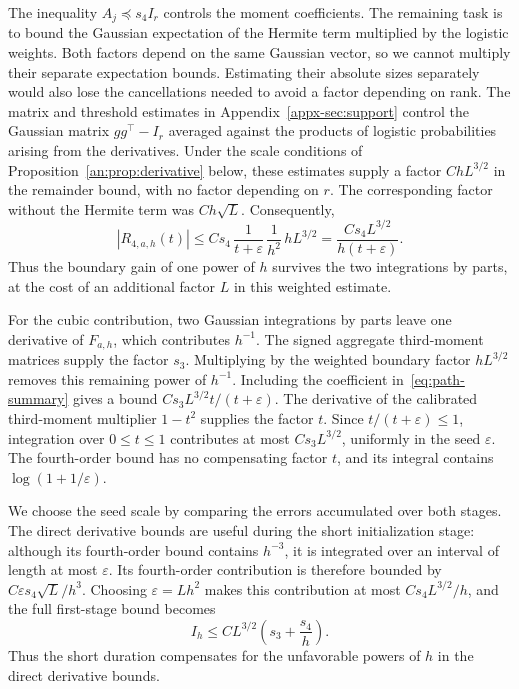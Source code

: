 \documentclass[11pt,letterpaper]{article}
\theoremstyle{remark}
\begin{document}
{{
The inequality \(A_j\preceq s_4I_r\) controls the moment
coefficients. The remaining task is to bound the Gaussian
expectation of the Hermite term multiplied by the logistic weights.
Both factors depend on the same Gaussian vector, so we cannot
multiply their separate expectation bounds.
Estimating their absolute sizes separately would also lose the
cancellations needed to avoid a factor depending on rank.
The matrix and threshold estimates in
Appendix~\ref{appx-sec:support} control the Gaussian matrix
\(gg^\top-I_r\) averaged against the products of logistic
probabilities arising from the derivatives. Under the scale
conditions of Proposition~\ref{an:prop:derivative} {below}, these estimates
supply a factor \(ChL^{3/2}\) in the remainder bound, with no factor
depending on \(r\). The corresponding factor without the Hermite
term was \(Ch\sqrt L\).
Consequently,
\[
 |R_{4,a,h}(t)|
 \le Cs_4\,\frac1{t+\varepsilon}\,\frac1{h^2}\,hL^{3/2}
 =\frac{Cs_4L^{3/2}}{h(t+\varepsilon)}.
\]
Thus the boundary gain of one power of \(h\) survives the two
integrations by parts, at the cost of an additional factor \(L\)
in this weighted estimate.

For the cubic contribution, two Gaussian integrations by parts
leave one derivative of \(F_{a,h}\), which contributes \(h^{-1}\).
The signed aggregate third-moment matrices supply the factor
\(s_3\). Multiplying by the weighted boundary factor \(hL^{3/2}\)
removes this remaining power of \(h^{-1}\).
Including the coefficient in~\eqref{eq:path-summary} gives a bound
\(Cs_3L^{3/2}t/(t+\varepsilon)\).
The derivative of the calibrated third-moment multiplier
\(1-t^2\) supplies the factor \(t\). Since \(t/(t+\varepsilon)\le1\),
integration over \(0\le t\le1\) contributes at most \(Cs_3L^{3/2}\),
uniformly in the seed \(\varepsilon\). The fourth-order bound
has no compensating factor \(t\), and its integral contains
\(\log(1+1/\varepsilon)\).

We choose the seed scale by comparing the errors accumulated over
both stages. The direct derivative bounds are useful during the short
initialization stage: although its fourth-order bound contains
\(h^{-3}\), it is integrated over an interval of length at most
\(\varepsilon\). Its fourth-order contribution is therefore bounded by
\(C\varepsilon s_4\sqrt L/h^3\). Choosing \(\varepsilon=Lh^2\)
makes this contribution at most \(Cs_4L^{3/2}/h\), and the full
first-stage bound becomes
\[
 I_h\le CL^{3/2}\left(s_3+\frac{s_4}{h}\right).
\]
Thus the short duration compensates for the unfavorable powers of
\(h\) in the direct derivative bounds.

}}
\end{document}
